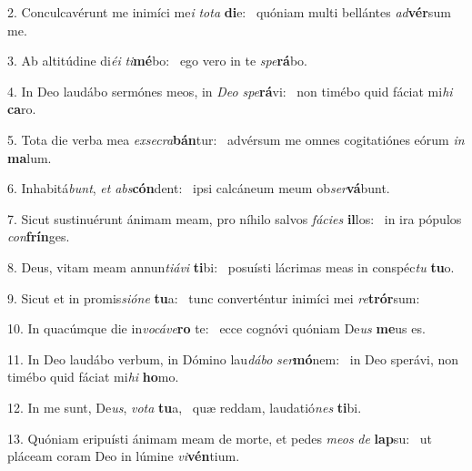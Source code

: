 2. Conculcavérunt me inimíci me\textit{i} \textit{to}\textit{ta} \textbf{di}e: \ast\  quóniam multi bellántes \textit{ad}\textbf{vér}sum me.\

3. Ab altitúdine di\textit{é}\textit{i} \textit{ti}\textbf{mé}bo: \ast\  ego vero in te \textit{spe}\textbf{rá}bo.\

4. In Deo laudábo sermónes meos, in \textit{De}\textit{o} \textit{spe}\textbf{rá}vi: \ast\  non timébo quid fáciat mi\textit{hi} \textbf{ca}ro.\

5. Tota die verba mea \textit{ex}\textit{se}\textit{cra}\textbf{bán}tur: \ast\  advérsum me omnes cogitatiónes eórum \textit{in} \textbf{ma}lum.\

6. Inhabitá\textit{bunt}, \textit{et} \textit{abs}\textbf{cón}dent: \ast\  ipsi calcáneum meum ob\textit{ser}\textbf{vá}bunt.\

7. Sicut sustinuérunt ánimam meam, pro níhilo salvos \textit{fá}\textit{ci}\textit{es} \textbf{il}los: \ast\  in ira pópulos \textit{con}\textbf{frín}ges.\

8. Deus, vitam meam annun\textit{ti}\textit{á}\textit{vi} \textbf{ti}bi: \ast\  posuísti lácrimas meas in conspéc\textit{tu} \textbf{tu}o.\

9. Sicut et in promis\textit{si}\textit{ó}\textit{ne} \textbf{tu}a: \ast\  tunc converténtur inimíci mei \textit{re}\textbf{trór}sum:\

10. In quacúmque die in\textit{vo}\textit{cá}\textit{ve}\textbf{ro} te: \ast\  ecce cognóvi quóniam De\textit{us} \textbf{me}us es.\

11. In Deo laudábo verbum, in Dómino lau\textit{dá}\textit{bo} \textit{ser}\textbf{mó}nem: \ast\  in Deo sperávi, non timébo quid fáciat mi\textit{hi} \textbf{ho}mo.\

12. In me sunt, De\textit{us}, \textit{vo}\textit{ta} \textbf{tu}a, \ast\  quæ reddam, laudatió\textit{nes} \textbf{ti}bi.\

13. Quóniam eripuísti ánimam meam de morte, et pedes \textit{me}\textit{os} \textit{de} \textbf{lap}su: \ast\  ut pláceam coram Deo in lúmine \textit{vi}\textbf{vén}tium.\

